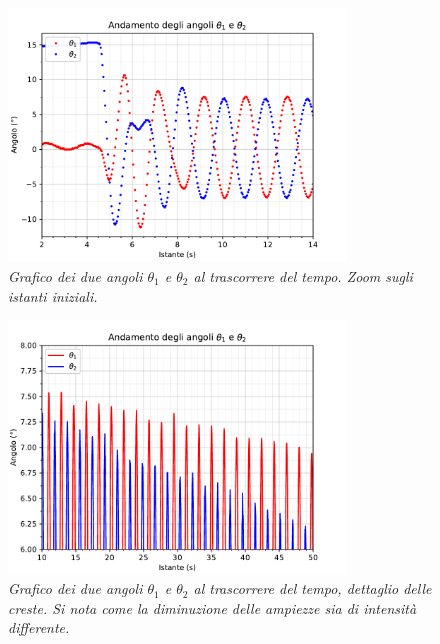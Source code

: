 \documentclass[11pt, a4paper, twoside, italian]{article}
\begin{document}
\begin{figure}[h!]
  \centering
  \includegraphics[width=0.8\textwidth]{../../media/plot/angles_accurate.pdf}
  \caption{\textit{Grafico dei due angoli $\theta_1$ e $\theta_2$ al trascorrere del tempo. Zoom sugli istanti iniziali.} }
  \label{anlges_accurate}
\end{figure}

\begin{figure}[h!]
  \centering
  \includegraphics[width=0.8\textwidth]{../../media/plot/angles_decrease.pdf}
  \caption{\textit{Grafico dei due angoli $\theta_1$ e $\theta_2$
  al trascorrere del tempo, dettaglio delle creste. Si nota come la diminuzione delle ampiezze
  sia di intensità differente.} }
  \label{angles_decrease}
\end{figure}
\end{document}
